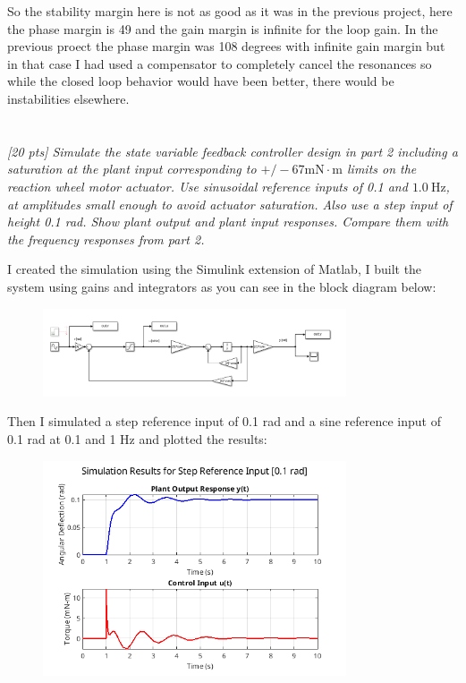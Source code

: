 \documentclass{article}
\begin{document}
So the stability margin here is not as good as it was in the previous project, here the phase margin is 49 and the gain margin is infinite for the loop gain.
In the previous proect the phase margin was 108 degrees with infinite gain margin but in that case I had used a compensator to completely cancel the resonances so while the closed loop behavior would have been better, there would be instabilities elsewhere.

\section{}
\textit{[20 pts] Simulate the state variable feedback controller design in part 2 including a saturation at the plant input corresponding to $+/-67 \mathrm{mN} \cdot \mathrm{m}$ limits on the reaction wheel motor actuator. Use sinusoidal reference inputs of 0.1 and $1.0 \mathrm{~Hz}$, at amplitudes small enough to avoid actuator saturation. Also use a step input of height 0.1 rad. Show plant output and plant input responses. Compare them with the frequency responses from part 2.}

I created the simulation using the Simulink extension of Matlab, I built the system using gains and integrators as you can see in the block diagram below:

\begin{figure}[H]
\centering
\includegraphics[width=0.8\textwidth]{simBlock.png}
\label{fig:simBlock}
\end{figure}

Then I simulated a step reference input of 0.1 rad and a sine reference input of 0.1 rad at 0.1 and 1 Hz and plotted the results:

\begin{figure}[H]
\centering
\includegraphics[width=0.8\textwidth]{stepResp.png}
\label{fig:stepResp}
\end{figure}
\end{document}
